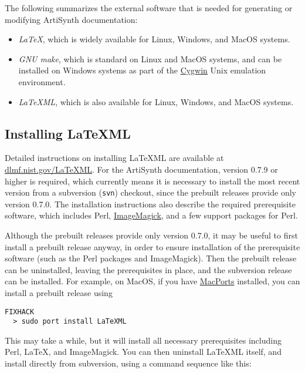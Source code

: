 \documentclass{article}
\begin{document}
The following summarizes the external software that
is needed for generating or modifying ArtiSynth
documentation:

\begin{itemize}

\item {\it LaTeX}, which is widely available for Linux, Windows,
and MacOS systems.

\item {\it GNU make}, which is standard on Linux and MacOS systems,
and can be installed on Windows systems as part of the 
\href{http://www.cygwin.com}{Cygwin} Unix emulation environment.

\item {\it LaTeXML}, which is also available for Linux, Windows, and
MacOS systems.  

\end{itemize}

\subsection{Installing LaTeXML}

Detailed instructions on installing LaTeXML are available at
\href{http://dlmf.nist.gov/LaTeXML/}{dlmf.nist.gov/LaTeXML}.  For the
ArtiSynth documentation, version 0.7.9 or higher is required, which
currently means it is necessary to install the most recent version
from a subversion ({\tt svn}) checkout, since the prebuilt releases
provide only version 0.7.0. The installation instructions also
describe the required prerequisite software, which includes Perl,
\href{http://www.imagemagick.org}{ImageMagick}, and a few support
packages for Perl.

Although the prebuilt releases provide only version 0.7.0, it may be
useful to first install a prebuilt release anyway, in order to ensure
installation of the prerequisite software (such as the Perl packages
and ImageMagick). Then the prebuilt release can be uninstalled,
leaving the prerequisites in place, and the subversion release can be
installed. For example, on MacOS, if you have 
\href{http://www.macports.org}{MacPorts} installed, 
you can install a prebuilt release
using 

\begin{lstlisting}FIXHACK
  > sudo port install LaTeXML
\end{lstlisting}

This may take a while, but it will install all necessary prerequisites
including Perl, LaTeX, and ImageMagick. You can then uninstall LaTeXML
itself, and install directly from subversion, using a command
sequence like this:
\end{document}
